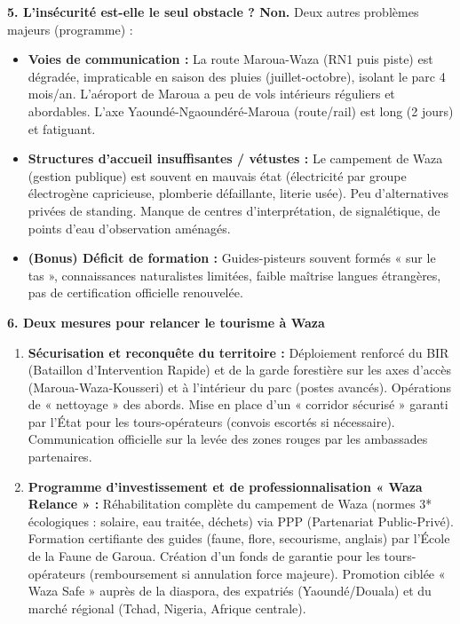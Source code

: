 \documentclass[11pt]{article}
\begin{document}
\begin{corrige}
\textbf{5. L'insécurité est-elle le seul obstacle ? Non.}
Deux autres problèmes majeurs (programme) :
\begin{itemize}
\item \textbf{Voies de communication :} La route Maroua-Waza (RN1 puis piste) est dégradée, impraticable en saison des pluies (juillet-octobre), isolant le parc 4 mois/an. L'aéroport de Maroua a peu de vols intérieurs réguliers et abordables. L'axe Yaoundé-Ngaoundéré-Maroua (route/rail) est long (2 jours) et fatiguant.
\item \textbf{Structures d'accueil insuffisantes / vétustes :} Le campement de Waza (gestion publique) est souvent en mauvais état (électricité par groupe électrogène capricieuse, plomberie défaillante, literie usée). Peu d'alternatives privées de standing. Manque de centres d'interprétation, de signalétique, de points d'eau d'observation aménagés.
\item \textbf{(Bonus) Déficit de formation :} Guides-pisteurs souvent formés « sur le tas », connaissances naturalistes limitées, faible maîtrise langues étrangères, pas de certification officielle renouvelée.
\end{itemize}

\textbf{6. Deux mesures pour relancer le tourisme à Waza}
\begin{enumerate}
\item \textbf{Sécurisation et reconquête du territoire :} Déploiement renforcé du BIR (Bataillon d'Intervention Rapide) et de la garde forestière sur les axes d'accès (Maroua-Waza-Kousseri) et à l'intérieur du parc (postes avancés). Opérations de « nettoyage » des abords. Mise en place d'un « corridor sécurisé » garanti par l'État pour les tours-opérateurs (convois escortés si nécessaire). Communication officielle sur la levée des zones rouges par les ambassades partenaires.
\item \textbf{Programme d'investissement et de professionnalisation « Waza Relance » :} Réhabilitation complète du campement de Waza (normes 3* écologiques : solaire, eau traitée, déchets) via PPP (Partenariat Public-Privé). Formation certifiante des guides (faune, flore, secourisme, anglais) par l'École de la Faune de Garoua. Création d'un fonds de garantie pour les tours-opérateurs (remboursement si annulation force majeure). Promotion ciblée « Waza Safe » auprès de la diaspora, des expatriés (Yaoundé/Douala) et du marché régional (Tchad, Nigeria, Afrique centrale).
\end{enumerate}
\end{corrige}
\end{document}
